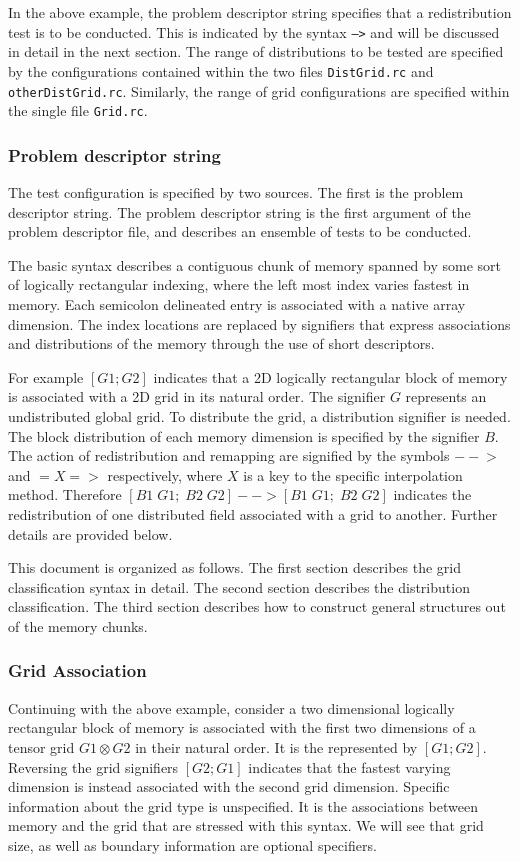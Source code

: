 In the above example, the problem descriptor string specifies that a redistribution test is to be conducted. This is indicated by the syntax  \texttt{-->} and will be discussed in detail in the next section. The range of distributions to be tested are specified by the configurations contained within the two files \texttt{DistGrid.rc} and  \texttt{otherDistGrid.rc}. Similarly, the range of grid configurations are specified within the single file \texttt{Grid.rc}.

\subsubsection{Problem descriptor string}
The test configuration is specified by two sources. The first is the problem descriptor string. The problem descriptor string is the first argument of the problem descriptor file, and describes an ensemble of tests to be conducted. 

The basic syntax describes a contiguous chunk of memory spanned by some sort of logically rectangular indexing, where the left most index varies fastest in memory. Each semicolon delineated entry is associated with a native array dimension. The index locations are replaced by signifiers that express associations and distributions of the memory through the use of short descriptors. 

For example $[ G1; G2 ]$ indicates that a 2D logically rectangular block of memory is associated with a 2D grid in its natural order. The signifier $G$ represents an undistributed global grid. To distribute the grid, a distribution signifier is needed. The block distribution of each memory dimension is specified by the signifier $B$. The action of redistribution and remapping are signified by the symbols $-- \!\!\! >$ and $=X=>$ respectively, where $X$ is a key to the specific interpolation method. Therefore $[B1 \; G1; \; B2 \; G2 ] --> [B1\; G1; \; B2  \; G2 ]$ indicates the redistribution of one distributed field associated with a grid to another. Further details are provided below.

This document is organized as follows. The first section describes the grid classification syntax in detail. The second section describes the distribution classification. The third section describes how to construct general structures out of the memory chunks. 

\subsubsection{Grid Association}
Continuing with the above example, consider a two dimensional logically rectangular block of memory is associated with the first two dimensions of a tensor grid $G1 \otimes G2$ in their natural order. It is the represented by $[ G1; G2 ]$. Reversing the grid signifiers $[ G2; G1 ]$ indicates that the fastest varying dimension is instead associated with the second grid dimension. Specific information about the grid type is unspecified. It is the associations between memory and the grid that are stressed with this syntax. We will see that grid size, as well as boundary information are optional specifiers. 

